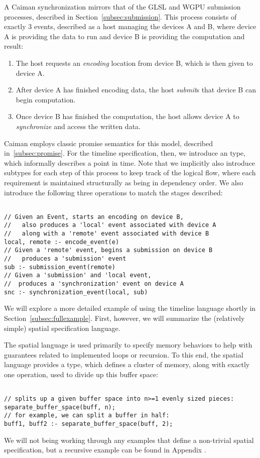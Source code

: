 A Caiman synchronization mirrors that of the GLSL and WGPU submission processes, described in Section~\ref{subsec:submission}.  This process consists of exactly 3 events, described as a host managing the devices A and B, where device A is providing the data to run and device B is providing the computation and result:
%
\begin{enumerate}
\item The host requests an \emph{encoding} location from device B, which is then given to device A.
\item After device A has finished encoding data, the host \emph{submit}s that device B can begin computation.
\item Once device B has finished the computation, the host allows device A to \emph{synchronize} and access the written data.
\end{enumerate}
%
Caiman employs classic promise semantics for this model, described in~\ref{subsec:promise}.  For the timeline specification, then, we introduce an  type, which informally describes a point in time.  Note that we implicitly also introduce subtypes for each step of this process to keep track of the logical flow, where each requirement is maintained structurally as being in dependency order. We also introduce the following three operations to match the stages described:
%
\begin{lstlisting}

// Given an Event, starts an encoding on device B,
//   also produces a 'local' event associated with device A
//   along with a 'remote' event associated with device B
local, remote :- encode_event(e)
// Given a 'remote' event, begins a submission on device B
//   produces a 'submission' event
sub :- submission_event(remote)
// Given a 'submission' and 'local event, 
//  produces a 'synchronization' event on device A
snc :- synchronization_event(local, sub)
\end{lstlisting}
%
We will explore a more detailed example of using the timeline language shortly in Section~\ref{subsec:fullexample}.  First, however, we will summarize the (relatively simple) spatial specification language.

The spatial language is used primarily to specify memory behaviors to help with guarantees related to implemented loops or recursion.  To this end, the spatial language provides a  type, which defines a cluster of memory, along with exactly one operation, used to divide up this buffer space:
%
\begin{lstlisting}

// splits up a given buffer space into n>=1 evenly sized pieces:
separate_buffer_space(buff, n);
// for example, we can split a buffer in half:
buff1, buff2 :- separate_buffer_space(buff, 2);
\end{lstlisting}
%
We will not being working through any examples that define a non-trivial spatial specification, but a recursive example can be found in Appendix .

